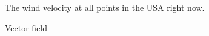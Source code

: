 The wind velocity at all points in the USA right now.

\begin{solution}
    Vector field
\end{solution}